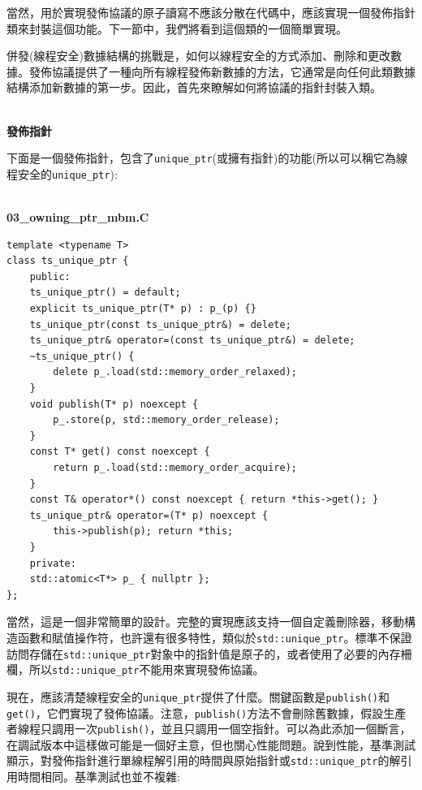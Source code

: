 當然，用於實現發佈協議的原子讀寫不應該分散在代碼中，應該實現一個發佈指針類來封裝這個功能。下一節中，我們將看到這個類的一個簡單實現。


併發(線程安全)數據結構的挑戰是，如何以線程安全的方式添加、刪除和更改數據。發佈協議提供了一種向所有線程發佈新數據的方法，它通常是向任何此類數據結構添加新數據的第一步。因此，首先來瞭解如何將協議的指針封裝入類。

\hspace*{\fill} \\ %
\noindent
\textbf{發佈指針}

下面是一個發佈指針，包含了\texttt{unique\_ptr}(或擁有指針)的功能(所以可以稱它為線程安全的\texttt{unique\_ptr}):

\hspace*{\fill} \\ %
\noindent
\textbf{03\_owning\_ptr\_mbm.C}
\begin{lstlisting}[style=styleCXX]
template <typename T>
class ts_unique_ptr {
	public:
	ts_unique_ptr() = default;
	explicit ts_unique_ptr(T* p) : p_(p) {}
	ts_unique_ptr(const ts_unique_ptr&) = delete;
	ts_unique_ptr& operator=(const ts_unique_ptr&) = delete;
	~ts_unique_ptr() {
		delete p_.load(std::memory_order_relaxed);
	}
	void publish(T* p) noexcept {
		p_.store(p, std::memory_order_release);
	}
	const T* get() const noexcept {
		return p_.load(std::memory_order_acquire);
	}
	const T& operator*() const noexcept { return *this->get(); }
	ts_unique_ptr& operator=(T* p) noexcept {
		this->publish(p); return *this;
	}
	private:
	std::atomic<T*> p_ { nullptr };
};
\end{lstlisting}

當然，這是一個非常簡單的設計。完整的實現應該支持一個自定義刪除器，移動構造函數和賦值操作符，也許還有很多特性，類似於\texttt{std::unique\_ptr}。標準不保證訪問存儲在\texttt{std::unique\_ptr}對象中的指針值是原子的，或者使用了必要的內存柵欄，所以\texttt{std::unique\_ptr}不能用來實現發佈協議。

現在，應該清楚線程安全的\texttt{unique\_ptr}提供了什麼。關鍵函數是\texttt{publish()}和\texttt{get()}，它們實現了發佈協議。注意，\texttt{publish()}方法不會刪除舊數據，假設生產者線程只調用一次\texttt{publish()}，並且只調用一個空指針。可以為此添加一個斷言，在調試版本中這樣做可能是一個好主意，但也關心性能問題。說到性能，基準測試顯示，對發佈指針進行單線程解引用的時間與原始指針或\texttt{std::unique\_ptr}的解引用時間相同。基準測試也並不複雜:

